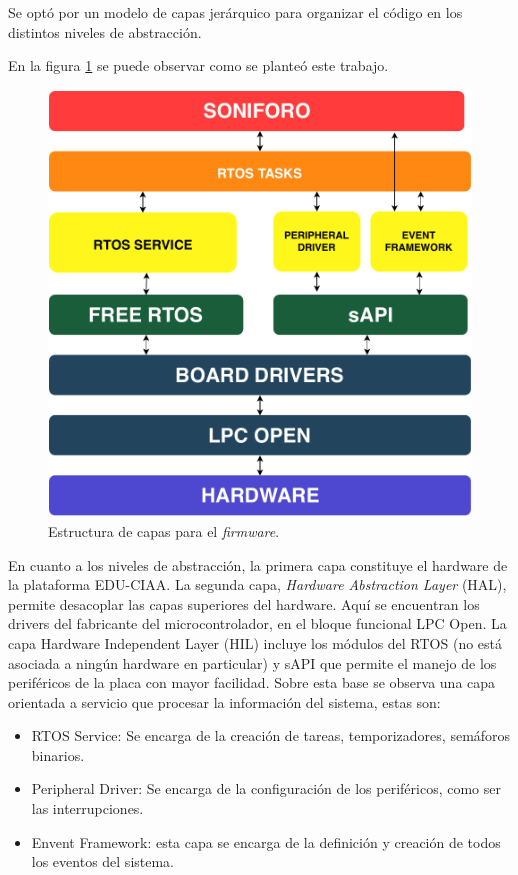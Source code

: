 Se optó por un modelo de capas jerárquico para organizar el código en los distintos niveles de abstracción.

En la figura \ref{fig:arquitecturaFirmwareGeneralSistema} se puede observar como se planteó este trabajo. 
\begin{figure}[h]
	\centering
	\includegraphics[scale=.5]{./Figures/arquitecturaGeneralSistema.pdf}
	\caption{Estructura de capas para el \textit{firmware}.}
	\label{fig:arquitecturaFirmwareGeneralSistema}
\end{figure}

En cuanto a los niveles de abstracción, la primera capa constituye el hardware de la plataforma EDU-CIAA. La segunda capa, \textit{Hardware Abstraction Layer} (HAL), permite desacoplar las capas superiores del hardware. Aquí se encuentran los
drivers del fabricante del microcontrolador, en el bloque funcional LPC Open. La capa Hardware Independent Layer (HIL) incluye los módulos del RTOS (no está asociada a ningún hardware en particular) y sAPI que permite el manejo de los periféricos de la placa con mayor facilidad.
Sobre esta base se observa una capa orientada a servicio que procesar la información del sistema, estas son: 
\begin{itemize}
\item RTOS Service: Se encarga de la creación de tareas, temporizadores, semáforos binarios.
\item Peripheral Driver: Se encarga de la configuración de los periféricos, como ser las interrupciones.
\item Envent Framework: esta capa se encarga de la definición y creación de todos los eventos del sistema.
\end{itemize}

